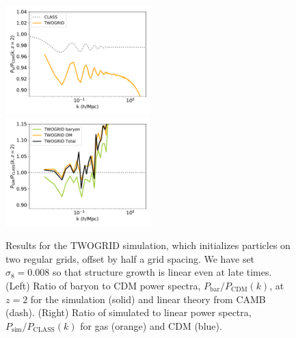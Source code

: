 \documentclass[a4paper,11pt]{article}
\begin{document}
\begin{figure}
  \includegraphics[width=0.5\textwidth]{plots/literature_2_relpower.pdf}
\includegraphics[width=0.5\textwidth]{plots/literature_2_class.pdf}
\caption{Results for the TWOGRID simulation, which initializes particles on two regular grids, offset by half a grid spacing. We have set $\sigma_8 = 0.008$ so that structure growth is linear even at late times. (Left) Ratio of baryon to CDM power spectra, $P_\mathrm{bar}/P_\mathrm{CDM}(k)$, at $z=2$ for the simulation (solid) and linear theory from CAMB (dash). (Right) Ratio of simulated to linear power spectra, $P_\mathrm{sim}/P_\mathrm{CLASS}(k)$ for gas (orange) and CDM (blue).}
  \label{fig:offsetgrids}
\end{figure}
\end{document}
